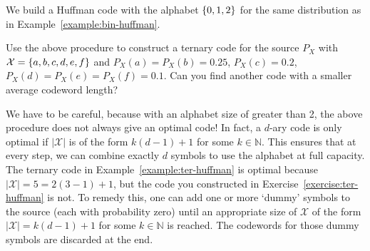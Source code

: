 \begin{example}\label{example:ter-huffman}
We build a Huffman code with the alphabet $\{0,1,2\}$ for the same distribution as in Example~\ref{example:bin-huffman}.
\begin{center}
\end{center}
\end{example}

\begin{exercise}\label{exercise:ter-huffman}
Use the above procedure to construct a ternary code for the source $P_X$ with $\mathcal{X} = \{a,b,c,d,e,f\}$ and $P_X(a) = P_X(b) = 0.25$, $P_X(c) = 0.2$, $P_X(d) = P_X(e) = P_X(f) = 0.1$. Can you find another code with a smaller average codeword length?
\end{exercise}
We have to be careful, because with an alphabet size of greater than 2, the above procedure does not always give an optimal code! In fact, a $d$-ary code is only optimal if $|\mathcal{X}|$ is of the form $k(d-1)+1$ for some $k \in \mathbb{N}$. This ensures that at every step, we can combine exactly $d$ symbols to use the alphabet at full capacity. The ternary code in Example~\ref{example:ter-huffman} is optimal because $|\mathcal{X}| = 5 = 2(3-1) + 1$, but the code you constructed in Exercise~\ref{exercise:ter-huffman} is not. To remedy this, one can add one or more `dummy' symbols to the source (each with probability zero) until an appropriate size of $\mathcal{X}$ of the form $|\mathcal{X}| = k(d-1)+1$ for some $k \in \mathbb{N}$ is reached. The codewords for those dummy symbols are discarded at the end.

